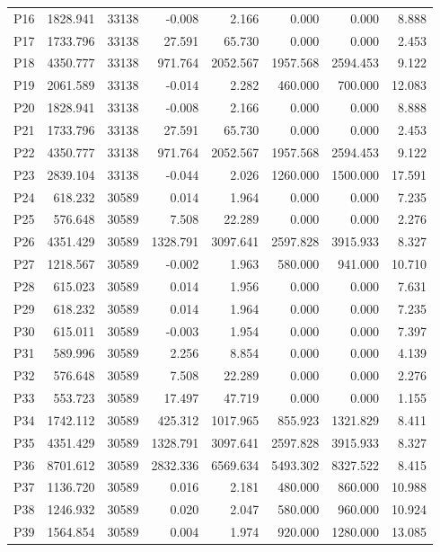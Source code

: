 \begin{longtable}{lrrrrrrr}
P16 & 1828.941 & 33138 & -0.008 & 2.166 & 0.000 & 0.000 & 8.888\\
P17 & 1733.796 & 33138 & 27.591 & 65.730 & 0.000 & 0.000 & 2.453\\
P18 & 4350.777 & 33138 & 971.764 & 2052.567 & 1957.568 & 2594.453 & 9.122\\
P19 & 2061.589 & 33138 & -0.014 & 2.282 & 460.000 & 700.000 & 12.083\\
P20 & 1828.941 & 33138 & -0.008 & 2.166 & 0.000 & 0.000 & 8.888\\
P21 & 1733.796 & 33138 & 27.591 & 65.730 & 0.000 & 0.000 & 2.453\\
P22 & 4350.777 & 33138 & 971.764 & 2052.567 & 1957.568 & 2594.453 & 9.122\\
P23 & 2839.104 & 33138 & -0.044 & 2.026 & 1260.000 & 1500.000 & 17.591\\
P24 & 618.232 & 30589 & 0.014 & 1.964 & 0.000 & 0.000 & 7.235\\
P25 & 576.648 & 30589 & 7.508 & 22.289 & 0.000 & 0.000 & 2.276\\
P26 & 4351.429 & 30589 & 1328.791 & 3097.641 & 2597.828 & 3915.933 & 8.327\\
P27 & 1218.567 & 30589 & -0.002 & 1.963 & 580.000 & 941.000 & 10.710\\
P28 & 615.023 & 30589 & 0.014 & 1.956 & 0.000 & 0.000 & 7.631\\
P29 & 618.232 & 30589 & 0.014 & 1.964 & 0.000 & 0.000 & 7.235\\
P30 & 615.011 & 30589 & -0.003 & 1.954 & 0.000 & 0.000 & 7.397\\
P31 & 589.996 & 30589 & 2.256 & 8.854 & 0.000 & 0.000 & 4.139\\
P32 & 576.648 & 30589 & 7.508 & 22.289 & 0.000 & 0.000 & 2.276\\
P33 & 553.723 & 30589 & 17.497 & 47.719 & 0.000 & 0.000 & 1.155\\
P34 & 1742.112 & 30589 & 425.312 & 1017.965 & 855.923 & 1321.829 & 8.411\\
P35 & 4351.429 & 30589 & 1328.791 & 3097.641 & 2597.828 & 3915.933 & 8.327\\
P36 & 8701.612 & 30589 & 2832.336 & 6569.634 & 5493.302 & 8327.522 & 8.415\\
P37 & 1136.720 & 30589 & 0.016 & 2.181 & 480.000 & 860.000 & 10.988\\
P38 & 1246.932 & 30589 & 0.020 & 2.047 & 580.000 & 960.000 & 10.924\\
P39 & 1564.854 & 30589 & 0.004 & 1.974 & 920.000 & 1280.000 & 13.085\\

\end{longtable}
